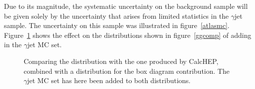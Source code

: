 Due to its magnitude, the systematic uncertainty on the background sample will be given solely by the uncertainty that arises from limited statistics in the \atlas{} $\gamma$jet sample. The uncertainty on this sample was illustrated in figure~\ref{atlasmc}. Figure~\ref{mccompjet} shows the effect on the distributions shown in figure~\ref{ggcomp} of adding in the $\gamma$jet MC set.

\begin{figure}[htp]
\begin{minipage}[b]{.69\textwidth}
\begin{infilsf} \tiny

\end{infilsf}
\end{minipage}
\begin{minipage}[b]{.3\textwidth}
\caption{Comparing the \atlas{} distribution with the one produced by CalcHEP, combined with a distribution for the box diagram contribution. The \atlas{} $\gamma$jet MC set has here been added to both distributions.}\label{mccompjet}
\end{minipage}
\end{figure}